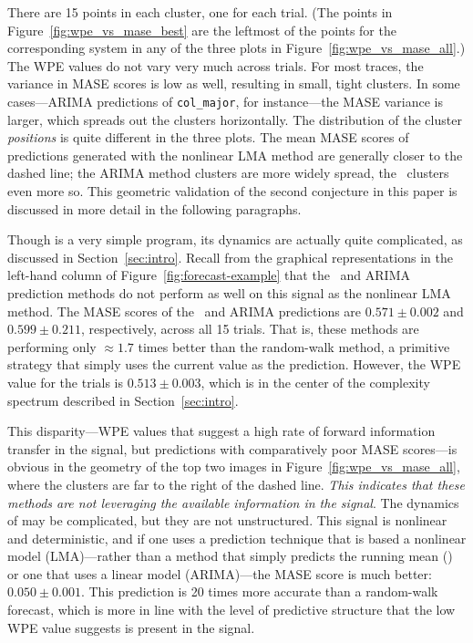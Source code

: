 There are 15 points in each cluster, one for each trial.  (The points
in Figure~\ref{fig:wpe_vs_mase_best} are the leftmost of the points
for the corresponding system in any of the three plots in
Figure~\ref{fig:wpe_vs_mase_all}.)  The WPE values do not vary very
much across trials.  For most traces, the variance in MASE scores is
low as well, resulting in small, tight clusters.  In some
cases---ARIMA predictions of {\tt col\_major}, for instance---the MASE
variance is larger, which spreads out the clusters horizontally.  The
distribution of the cluster \emph{positions} is quite different in the
three plots.  The mean MASE scores of predictions generated with the
nonlinear LMA method are generally closer to the dashed line; the
ARIMA method clusters are more widely spread, the \naive ~clusters
even more so.  This geometric validation of the second conjecture in
this paper is discussed in more detail in the following paragraphs.

Though \col is a very simple program, its dynamics are actually quite
complicated, as discussed in Section~\ref{sec:intro}.  Recall from the
graphical representations in the left-hand column of
Figure~\ref{fig:forecast-example} that the \naive ~and ARIMA
prediction methods do not perform as well on this signal as the
nonlinear LMA method.  The MASE scores of the \naive ~and ARIMA
predictions are $0.571 \pm 0.002$ and $0.599 \pm 0.211$, respectively,
across all 15 trials.  That is, these methods are performing only
$\approx 1.7$ times better than the random-walk method, a primitive
strategy that simply uses the current value as the prediction.
However, the WPE value for the \col trials is $0.513 \pm 0.003$, which
is in the center of the complexity spectrum described in
Section~\ref{sec:intro}.

This disparity---WPE values that suggest a high rate of forward
information transfer in the signal, but predictions with comparatively
poor MASE scores---is obvious in the geometry of the top two images
in Figure~\ref{fig:wpe_vs_mase_all}, where the \col clusters are far
to the right of the dashed line.  \emph{This indicates that these
  methods are not leveraging the available information in the signal}.
The dynamics of \col may be complicated, but they are not
unstructured.  This signal is nonlinear and deterministic\cite{mytkowicz09}, and if one
uses a prediction technique that is based a nonlinear model
(LMA)---rather than a method that simply predicts the running mean
(\naive) or one that uses a linear model (ARIMA)---the MASE score is
much better: $0.050 \pm 0.001$.  This prediction is 20 times more
accurate than a random-walk forecast, which is more in line with the
level of predictive structure that the low WPE value suggests is
present in the signal.  

